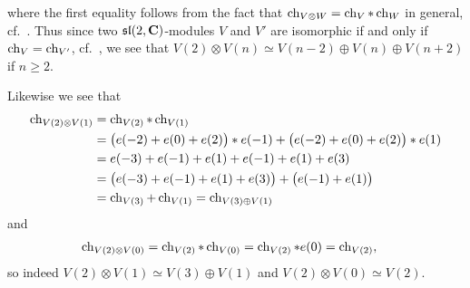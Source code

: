 where the first equality follows from the fact that $\operatorname{ch}_{V\otimes W}=\operatorname{ch}_V * \operatorname{ch}_W$ in general, cf.\ \cite[125]{humphrey}. Thus since two $\mathfrak{sl}(2,\mathbf{C})$-modules $V$ and $V'$ are isomorphic if and only if $\operatorname{ch}_V=\operatorname{ch}_{V'}$, cf.\ \cite[90]{jantzen}, we see that $V(2)\otimes V(n) \simeq V(n-2)\oplus V(n)\oplus V(n+2)$ if $n\geq 2$.

Likewise we see that
\begin{align*}
  \operatorname{ch}_{V(2)\otimes V(1)} &= \operatorname{ch}_{V(2)}*\operatorname{ch}_{V(1)} \\
  &= \bigl(e(-2)+e(0)+e(2)\bigr)*e(-1) + \bigl(e(-2)+e(0)+e(2)\bigr)*e(1) \\
                         &= e(-3)+e(-1)+e(1)+e(-1)+e(1)+e(3) \\
                         &= \bigl(e(-3)+e(-1)+e(1)+e(3)\bigr) + \bigl(e(-1)+e(1)\bigr) \\
  &= \operatorname{ch}_{V(3)} + \operatorname{ch}_{V(1)} = \operatorname{ch}_{V(3)\oplus V(1)}
\end{align*}
and
\begin{align*}
  \operatorname{ch}_{V(2)\otimes V(0)} &= \operatorname{ch}_{V(2)}*\operatorname{ch}_{V(0)} = \operatorname{ch}_{V(2)}*e(0) = \operatorname{ch}_{V(2)},
\end{align*}
so indeed $V(2)\otimes V(1)\simeq V(3)\oplus V(1)$ and $V(2)\otimes V(0)\simeq V(2)$. 

